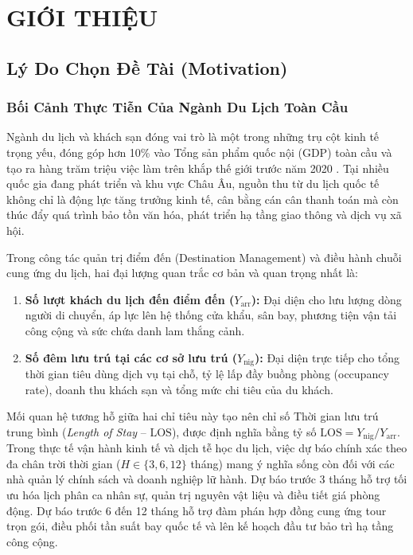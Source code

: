 \chapter{GIỚI THIỆU}
\label{ch:introduction}

\section{Lý Do Chọn Đề Tài (Motivation)}
\label{sec:motivation}

\subsection{Bối Cảnh Thực Tiễn Của Ngành Du Lịch Toàn Cầu}
Ngành du lịch và khách sạn đóng vai trò là một trong những trụ cột kinh tế trọng yếu, đóng góp hơn 10\% vào Tổng sản phẩm quốc nội (GDP) toàn cầu và tạo ra hàng trăm triệu việc làm trên khắp thế giới trước năm 2020 \cite{unwto2010recommendations, song2021tourism}. Tại nhiều quốc gia đang phát triển và khu vực Châu Âu, nguồn thu từ du lịch quốc tế không chỉ là động lực tăng trưởng kinh tế, cân bằng cán cân thanh toán mà còn thúc đẩy quá trình bảo tồn văn hóa, phát triển hạ tầng giao thông và dịch vụ xã hội.

Trong công tác quản trị điểm đến (Destination Management) và điều hành chuỗi cung ứng du lịch, hai đại lượng quan trắc cơ bản và quan trọng nhất là:
\begin{enumerate}
    \item \textbf{Số lượt khách du lịch đến điểm đến ($Y_{\text{arr}}$):} Đại diện cho lưu lượng dòng người di chuyển, áp lực lên hệ thống cửa khẩu, sân bay, phương tiện vận tải công cộng và sức chứa danh lam thắng cảnh.
    \item \textbf{Số đêm lưu trú tại các cơ sở lưu trú ($Y_{\text{nig}}$):} Đại diện trực tiếp cho tổng thời gian tiêu dùng dịch vụ tại chỗ, tỷ lệ lấp đầy buồng phòng (occupancy rate), doanh thu khách sạn và tổng mức chi tiêu của du khách.
\end{enumerate}

Mối quan hệ tương hỗ giữa hai chỉ tiêu này tạo nên chỉ số Thời gian lưu trú trung bình (\textit{Length of Stay} -- $\text{LOS}$), được định nghĩa bằng tỷ số $\text{LOS} = Y_{\text{nig}} / Y_{\text{arr}}$. Trong thực tế vận hành kinh tế và dịch tễ học du lịch, việc dự báo chính xác theo đa chân trời thời gian ($H \in \{3, 6, 12\}$ tháng) mang ý nghĩa sống còn đối với các nhà quản lý chính sách và doanh nghiệp lữ hành. Dự báo trước 3 tháng hỗ trợ tối ưu hóa lịch phân ca nhân sự, quản trị nguyên vật liệu và điều tiết giá phòng động. Dự báo trước 6 đến 12 tháng hỗ trợ đàm phán hợp đồng cung ứng tour trọn gói, điều phối tần suất bay quốc tế và lên kế hoạch đầu tư bảo trì hạ tầng công cộng.

